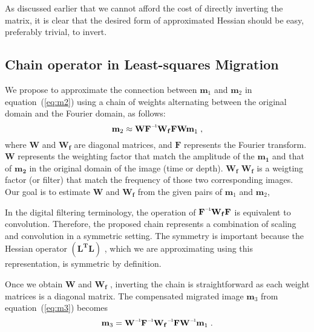 As discussed earlier that we cannot afford the cost of directly inverting the matrix, it is clear that the desired form of approximated Hessian should be easy, preferably trivial, to invert.


\subsection*{Chain operator in Least-squares Migration}

We propose to approximate the connection between $\mathbf{m}_1$ and $\mathbf{m}_2$ in equation~(\ref{eq:m2}) using a chain of weights alternating between the original domain and the Fourier domain, as follows:
\begin{equation}
    \label{eq:wfw}
    \mathbf{m}_2 \approx \mathbf{W\inv{F}W_{f}FW m}_1\;,
\end{equation}
where $\mathbf{W}$ and $\mathbf{W_f}$ are diagonal matrices, and $\mathbf{F}$ represents the Fourier transform. $\mathbf{W}$ represents the weighting factor that match the amplitude of the $\mathbf{m_1}$ and that of $\mathbf{m_2}$ in the original domain of the image (time or depth). $\mathbf{W_f}$ $\mathbf{W_f}$ is a weigting factor (or filter) that match the frequency of those two corresponding images. Our goal is to estimate $\mathbf{W}$ and $\mathbf{W_f}$ from the given pairs of $\mathbf{m}_1$ and $\mathbf{m}_2$,

 In the digital filtering terminology, the operation of $\mathbf{\inv{F}W_{f}F}$ is equivalent to convolution. Therefore, the proposed chain represents a combination of scaling and convolution in a symmetric setting. The symmetry is important because the Hessian operator $\mathbf{(L^T L)}$ , which we are approximating using this representation, is symmetric by definition. 
 
 Once we obtain $\mathbf{W} $ and $ \mathbf{W_f }$ , inverting the chain is straightforward as each weight matrices is a diagonal matrix. The compensated migrated image $\mathbf{m}_3$ from equation~(\ref{eq:m3}) becomes
\begin{equation}
 \mathbf{
m}_{3} = 
\mathbf{\inv{W}\inv{F}\inv{W_f}F\inv{W} m}_1\;.
\label{lsmig}
\end{equation}
 



